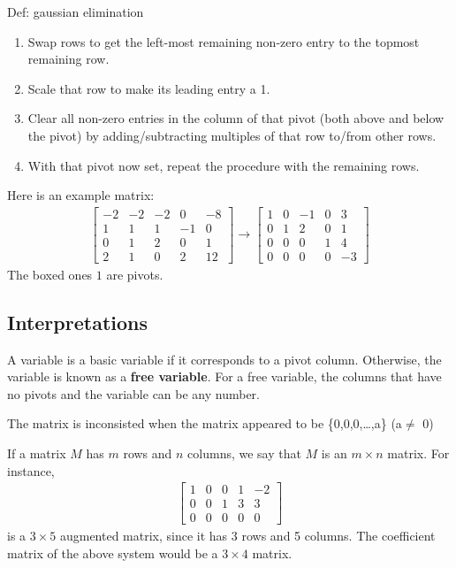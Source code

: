 \documentclass{package/notes}
\begin{document}
\begin{definition}{Def: gaussian elimination}
    \begin{enumerate}
    \item Swap rows to get the left-most remaining non-zero entry to the topmost remaining row.
    \item Scale that row to make its leading entry a 1.
    \item Clear all non-zero entries in the column of that pivot (both above and below the pivot) by adding/subtracting multiples of that row to/from other rows.
    \item With that pivot now set, repeat the procedure with the remaining rows.
\end{enumerate}
\end{definition}


Here is an example matrix:
\begin{align*}       
\left[               
\begin{array}{ccccc}   
-2 & -2 & -2 & 0 & -8\\
1 & 1 & 1 & -1 & 0 \\
0 & 1 & 2 & 0 & 1\\
2& 1&0&2&12
\end{array}
\right]              
\rightarrow
\left[            
\begin{array}{ccccc}   
\boxed{1} & 0 & -1 & 0 & 3\\
0 & \boxed{1} & 2 & 0 & 1 \\
0 & 0 & 0 & \boxed{1} & 4\\
0& 0&0&0&-3
\end{array}
\right]
\end{align*}
The boxed ones $\boxed{1}$ are pivots.
\subsection{Interpretations}
\begin{definition}
    
     A variable is a basic variable if it corresponds to a pivot column. Otherwise, the variable is known as a \textbf{free variable}. For a free variable, the columns that have no pivots and the variable can be any number. 
\end{definition}


The matrix is inconsisted when the matrix appeared to be \{0,0,0,\dots,a\} (a$\neq$ 0)

If a matrix $M$ has $m$ rows and $n$ columns, we say that $M$ is an $m\times n$ matrix. For instance,
\begin{align*}
    \left[         
\begin{array}{ccccc}   
1 & 0 & 0 & 1 & -2\\
0 & 0 & 1 & 3 & 3 \\
0 & 0 & 0 & 0 & 0
\end{array}
\right]
\end{align*}
is a $3\times 5$ augmented matrix, since it has 3 rows and 5 columns. The coefficient matrix of the above system would be a $3\times 4$ matrix.
\end{document}
